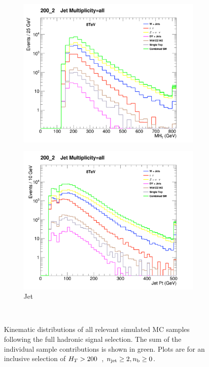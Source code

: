 \begin{figure}[!ht]
    \begin{subfigure}[b]{0.48\textwidth}
      \includegraphics[width=\textwidth]{Figs/datamc/had/v1/MHT_all_200_upwards}
      \caption{\mht}
    \end{subfigure}
    \begin{subfigure}[b]{0.48\textwidth}
      \includegraphics[width=\textwidth]{Figs/datamc/had/v1/CommonJetPt_all_200_upwards}
      \caption{Jet \Pt}
    \end{subfigure} \\
    \caption{\label{fig:datamc_had_inc}
    Kinematic distributions of all relevant simulated MC samples following
    the full hadronic signal selection. The 
    sum of the individual sample contributions is shown in green. Plots
    are for an inclusive selection of $H_T>200$~\gev, $n_{\text{jet}}\geq2, n_{\text{b}}\geq0$.
    }
\end{figure}

